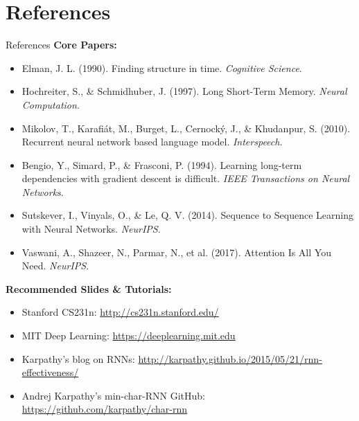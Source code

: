 \section{References}
\begin{frame}[allowframebreaks]{References}
    \textbf{Core Papers:}
    \begin{itemize}
        \item Elman, J. L. (1990). Finding structure in time. \textit{Cognitive Science}.
        \item Hochreiter, S., \& Schmidhuber, J. (1997). Long Short-Term Memory. \textit{Neural Computation}.
        \item Mikolov, T., Karafiát, M., Burget, L., Cernocký, J., \& Khudanpur, S. (2010). Recurrent neural network based language model. \textit{Interspeech}.
        \item Bengio, Y., Simard, P., \& Frasconi, P. (1994). Learning long-term dependencies with gradient descent is difficult. \textit{IEEE Transactions on Neural Networks}.
        \item Sutskever, I., Vinyals, O., \& Le, Q. V. (2014). Sequence to Sequence Learning with Neural Networks. \textit{NeurIPS}.
        \item Vaswani, A., Shazeer, N., Parmar, N., et al. (2017). Attention Is All You Need. \textit{NeurIPS}.
    \end{itemize}

    \framebreak

    \textbf{Recommended Slides \& Tutorials:}
    \begin{itemize}
        \item Stanford CS231n: \url{http://cs231n.stanford.edu/}
        \item MIT Deep Learning: \url{https://deeplearning.mit.edu}
        \item Karpathy’s blog on RNNs: \url{http://karpathy.github.io/2015/05/21/rnn-effectiveness/}
        \item Andrej Karpathy’s min-char-RNN GitHub: \url{https://github.com/karpathy/char-rnn}
    \end{itemize}
\end{frame}